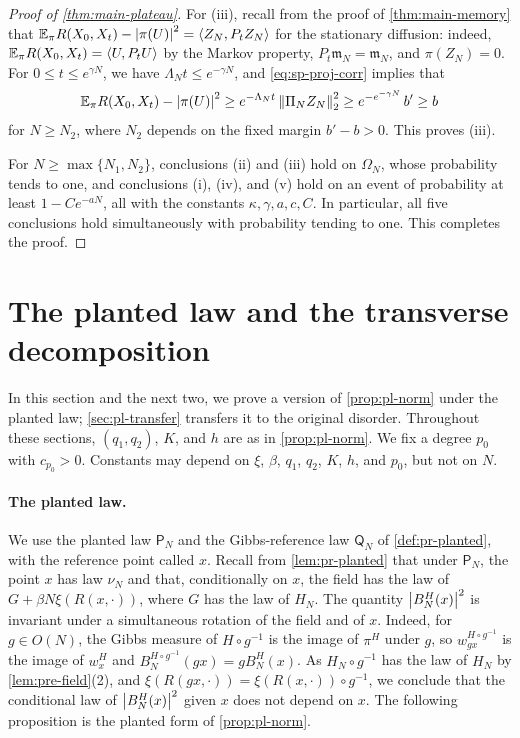 \begin{proof}[Proof of \cref{thm:main-plateau}]
For (iii), recall from the proof of \cref{thm:main-memory} that $\mathbb E_\pi R(X_0,X_t)-\left|\pi(U)\right|^2=\langle Z_N,P_tZ_N\rangle$ for the stationary diffusion: indeed, $\mathbb E_\pi R(X_0,X_t)=\langle U,P_tU\rangle$ by the Markov property, $P_t\mathfrak m_N=\mathfrak m_N$, and $\pi(Z_N)=0$. For $0\le t\le e^{\gamma N}$, we have $\Lambda_Nt\le e^{-\gamma N}$, and \eqref{eq:sp-proj-corr} implies that
\[
\mathbb E_\pi R(X_0,X_t)-\left|\pi(U)\right|^2\ge e^{-\Lambda_Nt}\left\lVert\Pi_NZ_N\right\rVert_2^2\ge e^{-e^{-\gamma N}}\,b'\ge b
\]
for $N\ge N_2$, where $N_2$ depends on the fixed margin $b'-b>0$. This proves (iii).

For $N\ge\max\{N_1,N_2\}$, conclusions (ii) and (iii) hold on $\Omega_N$, whose probability tends to one, and conclusions (i), (iv), and (v) hold on an event of probability at least $1-Ce^{-aN}$, all with the constants $\kappa,\gamma,a,c,C$. In particular, all five conclusions hold simultaneously with probability tending to one. This completes the proof.
\end{proof}


\section{The planted law and the transverse decomposition}\label{sec:pl-planted}

In this section and the next two, we prove a version of \cref{prop:pl-norm} under the planted law; \cref{sec:pl-transfer} transfers it to the original disorder. Throughout these sections, $(q_1,q_2)$, $K$, and $h$ are as in \cref{prop:pl-norm}. We fix a degree $p_0$ with $c_{p_0}>0$. Constants may depend on $\xi$, $\beta$, $q_1$, $q_2$, $K$, $h$, and $p_0$, but not on $N$.

\paragraph{The planted law.}
We use the planted law $\mathsf P_N$ and the Gibbs-reference law $\mathsf Q_N$ of \cref{def:pr-planted}, with the reference point called $x$. Recall from \cref{lem:pr-planted} that under $\mathsf P_N$, the point $x$ has law $\nu_N$ and that, conditionally on $x$, the field has the law of $G+\beta N\xi(R(x,\cdot))$, where $G$ has the law of $H_N$. The quantity $\left|B_N^H(x)\right|^2$ is invariant under a simultaneous rotation of the field and of $x$. Indeed, for $g\in O(N)$, the Gibbs measure of $H\circ g^{-1}$ is the image of $\pi^H$ under $g$, so $w^{H\circ g^{-1}}_{gx}$ is the image of $w^H_x$ and $B_N^{H\circ g^{-1}}(gx)=gB_N^H(x)$. As $H_N\circ g^{-1}$ has the law of $H_N$ by \cref{lem:pre-field}(2), and $\xi(R(gx,\cdot))=\xi(R(x,\cdot))\circ g^{-1}$, we conclude that the conditional law of $\left|B_N^H(x)\right|^2$ given $x$ does not depend on $x$. The following proposition is the planted form of \cref{prop:pl-norm}.

